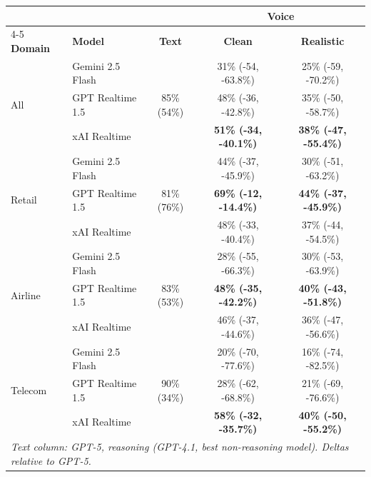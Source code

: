 \begin{tabular}{@{}llccc@{}}
\toprule
 &  &  & \multicolumn{2}{c}{\textbf{Voice}} \\
\cmidrule(l){4-5}
\textbf{Domain} & \textbf{Model} & \textbf{Text} & \textbf{Clean} & \textbf{Realistic} \\
\midrule
\multirow{3}{*}{All} & Gemini 2.5 Flash & \multirow{3}{*}{85\% (54\%)} & 31\% (-54, -63.8\%) & 25\% (-59, -70.2\%) \\
 & GPT Realtime 1.5 &  & 48\% (-36, -42.8\%) & 35\% (-50, -58.7\%) \\
 & xAI Realtime &  & \textbf{51\% (-34, -40.1\%)} & \textbf{38\% (-47, -55.4\%)} \\
\midrule
\multirow{3}{*}{Retail} & Gemini 2.5 Flash & \multirow{3}{*}{81\% (76\%)} & 44\% (-37, -45.9\%) & 30\% (-51, -63.2\%) \\
 & GPT Realtime 1.5 &  & \textbf{69\% (-12, -14.4\%)} & \textbf{44\% (-37, -45.9\%)} \\
 & xAI Realtime &  & 48\% (-33, -40.4\%) & 37\% (-44, -54.5\%) \\
\midrule
\multirow{3}{*}{Airline} & Gemini 2.5 Flash & \multirow{3}{*}{83\% (53\%)} & 28\% (-55, -66.3\%) & 30\% (-53, -63.9\%) \\
 & GPT Realtime 1.5 &  & \textbf{48\% (-35, -42.2\%)} & \textbf{40\% (-43, -51.8\%)} \\
 & xAI Realtime &  & 46\% (-37, -44.6\%) & 36\% (-47, -56.6\%) \\
\midrule
\multirow{3}{*}{Telecom} & Gemini 2.5 Flash & \multirow{3}{*}{90\% (34\%)} & 20\% (-70, -77.6\%) & 16\% (-74, -82.5\%) \\
 & GPT Realtime 1.5 &  & 28\% (-62, -68.8\%) & 21\% (-69, -76.6\%) \\
 & xAI Realtime &  & \textbf{58\% (-32, -35.7\%)} & \textbf{40\% (-50, -55.2\%)} \\
\bottomrule
\multicolumn{5}{l}{\footnotesize \textit{Text column: GPT-5, reasoning (GPT-4.1, best non-reasoning model). Deltas relative to GPT-5.}} \\
\end{tabular}